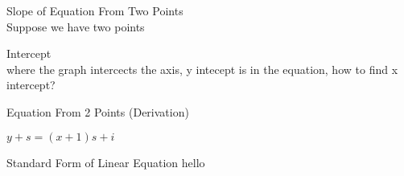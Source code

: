 \documentclass{book}
\begin{document}
  {\example Slope of Equation From Two Points \\
    Suppose we have two points
  }


  {\remark Intercept \\
    where the graph intercects the axis, y intecept is in the equation, how to find x intercept?
  }

  {\remark Equation From 2 Points (Derivation)

    $y + s = (x + 1)s + i$
  }


  {\remark Standard Form of Linear Equation 
    hello
  }
\end{document}
